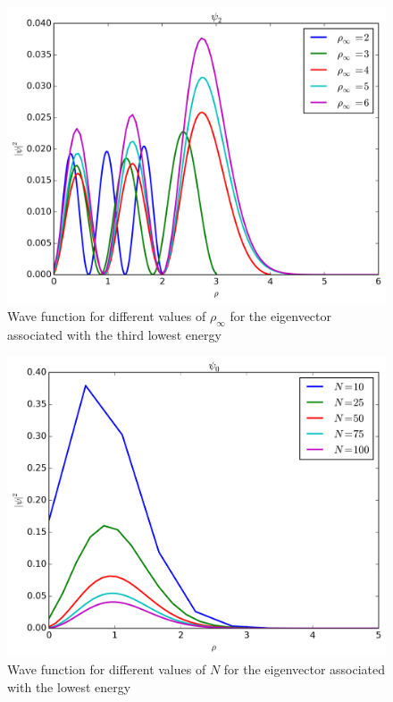 \documentclass[11pt,a4paper,english,final]{article}
\numberwithin{equation}{section}
\newcommand{\figurewidth}{.85\textwidth}
\begin{document}
\begin{figure}
\centering
\includegraphics[width=\figurewidth]{../results/psi_inf_compare_psi2.png}
\caption{Wave function for different values of $\rho_\infty$ for
the eigenvector associated with the third lowest energy}
\label{fig:psi2rho}
\end{figure}

\begin{figure}
\centering
\includegraphics[width=\figurewidth]{../results/N_compare_psi0.png}
\caption{Wave function for different values of $N$ for
the eigenvector associated with the lowest energy}
\label{fig:psi0N}
\end{figure}
\end{document}
